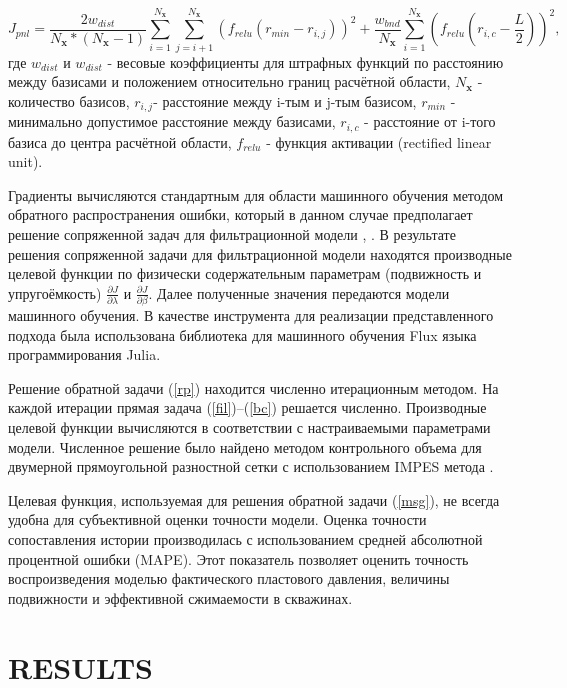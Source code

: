 \documentclass{article}
\begin{document}
\begin{equation*} \label{pnl}
	J_{pnl}=\frac{2w_{dist}}{N_\textbf{x}*(N_\textbf{x}-1)}\sum_{i=1}^{N_\textbf{x}}{\sum_{j=i+1 }^{N_\textbf{x}}{\left(f_{relu}\left(r_{min} - r_{i,j}\right)\right)^2}} + 
	\frac{w_{bnd}}{N_\textbf{x}}\sum_{i=1}^{N_\textbf{x}}{\left(f_{relu}\left(r_{i,c} - \frac{L}{2}\right)\right)^2},
\end{equation*}
где $w_{dist}$ и $w_{dist}$ - весовые коэффициенты для штрафных функций по расстоянию между базисами и положением относительно границ расчётной области, $N_\textbf{x}$ - количество базисов, $r_{i,j}$- расстояние между i-тым и j-тым базисом,  $r_{min}$ - минимально допустимое расстояние между базисами,  $r_{i,c}$ - расстояние от i-того базиса до центра расчётной области, $f_{relu}$ - функция активации (rectified linear unit).

	
Градиенты вычисляются стандартным для области машинного обучения методом обратного распространения ошибки, который в данном случае предполагает решение сопряженной задач для фильтрационной модели \cite{kos3}, \cite{far}. 
В результате решения сопряженной задачи для фильтрационной модели находятся производные целевой функции по физически содержательным параметрам (подвижность и упругоёмкость) $\frac{\partial J}{\partial \lambda}$ и $\frac{\partial J}{\partial \beta}$. Далее полученные значения передаются модели машинного обучения. В качестве инструмента для реализации представленного подхода была использована библиотека для машинного обучения Flux \cite{inn} языка программирования Julia.

Решение обратной задачи (\ref{rp}) находится численно
итерационным методом. На каждой итерации прямая задача
(\ref{fil})--(\ref{bc}) решается численно. Производные
целевой функции вычисляются в соответствии с настраиваемыми
параметрами модели. Численное решение было найдено
методом контрольного объема для двумерной прямоугольной
разностной сетки с использованием IMPES метода \cite{azi}.

Целевая функция, используемая для решения обратной задачи ({\ref{msg}}), не всегда удобна для субъективной оценки точности модели. Оценка точности сопоставления истории производилась с использованием средней абсолютной процентной ошибки (MAPE). Этот показатель позволяет оценить точность воспроизведения моделью фактического пластового давления, величины подвижности и эффективной сжимаемости в скважинах.


\section{RESULTS}
\end{document}
